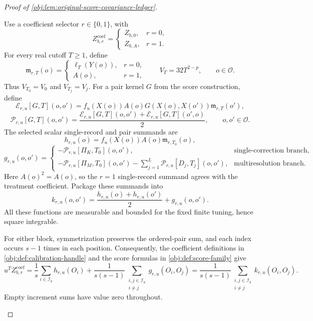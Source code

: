 \begin{proof}[Proof of \cref{obj:lem:original-score-covariance-ledger}]
\begin{enumerate}
Use a coefficient selector \(r\in\{0,1\}\), with
\[
Z_{b,r}^{\mathrm{coef}}
=
\begin{cases}
Z_{b,0},&r=0,\\
Z_{b,A},&r=1.
\end{cases}
\]
For every real cutoff \(T\ge1\), define
\[
\mathfrak m_{r,T}(o)
=
\begin{cases}
\ell_T(Y(o)),&r=0,\\
A(o),&r=1,
\end{cases}
\qquad
V_T=32T^{2-p},
\qquad o\in\mathcal O.
\]
Thus \(V_{T_0}=V_0\) and \(V_{T_j}=V_j\). For a pair kernel \(G\) from the score construction, define
\[
\mathscr E_{r,u}[G,T](o,o')
=
f_u(X(o))A(o)G(X(o),X(o'))\mathfrak m_{r,T}(o'),
\]
\[
\mathscr P_{r,u}[G,T](o,o')
=
\frac{
\mathscr E_{r,u}[G,T](o,o')
+
\mathscr E_{r,u}[G,T](o',o)
}{2},
\qquad o,o'\in\mathcal O.
\]
The selected scalar single-record and pair summands are
\[
h_{r,u}(o)=f_u(X(o))A(o)\mathfrak m_{r,T_0}(o),
\]
\[
g_{r,u}(o,o')
=
\begin{cases}
-\mathscr P_{r,u}[\Pi_K,T_0](o,o'),
&\text{single-correction branch},\\[1mm]
-\mathscr P_{r,u}[\Pi_M,T_0](o,o')
-\displaystyle\sum_{j=1}^{L}\mathscr P_{r,u}[D_j,T_j](o,o'),
&\text{multiresolution branch}.
\end{cases}
\]
Here \(A(o)^2=A(o)\), so the \(r=1\) single-record summand agrees with the treatment coefficient. Package these summands into
\[
k_{r,u}(o,o')
=
\frac{h_{r,u}(o)+h_{r,u}(o')}{2}
+
g_{r,u}(o,o').
\]
All these functions are measurable and bounded for the fixed finite tuning, hence square integrable.

For either block, symmetrization preserves the ordered-pair sum, and each index occurs \(s-1\) times in each position. Consequently, the coefficient definitions in \cref{obj:def:calibration-handle} and the score formulas in \cref{obj:def:score-family} give
\[
u^TZ_{b,r}^{\mathrm{coef}}
=
\frac1s\sum_{i\in\mathcal I_b}h_{r,u}(O_i)
+
\frac1{s(s-1)}
\sum_{\substack{i,j\in\mathcal I_b\\i\ne j}}
g_{r,u}(O_i,O_j)
=
\frac1{s(s-1)}
\sum_{\substack{i,j\in\mathcal I_b\\i\ne j}}
k_{r,u}(O_i,O_j).
\]
Empty increment sums have value zero throughout.


\end{enumerate}
\end{proof}

